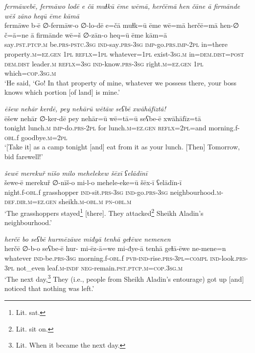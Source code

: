 \ea \label{PM.20}
\textit{fermāwebē, fermāwo lodē e čā muɫkū ēme wēmā, herčēmā hen čāne ā firmānde wēš zāno heqū ēme kāmā} \\ 
\gll fermāwe b-ē ∅-fermāw-o ∅-lo-dē e=čā muɫk=ū ēme wē=mā herčē=mā hen-∅ č=ā=ne ā firmānde wē=š ∅-zān-o heq=ū ēme kām=ā \\ 
 say\textsc{.pst}\textsc{.ptcp}\textsc{.m} be\textsc{.prs}\textsc{-pstc}\textsc{.3sg} \textsc{ind-}say\textsc{.prs}\textsc{-3sg} \textsc{imp-}go\textsc{.prs}.\textsc{imp-}\textsc{2pl} in=there property\textsc{.m}\textsc{\textsc{=ez.gen}} \textsc{1pl} \textsc{reflx}\textsc{=1pl} whatever\textsc{=1pl} exist\textsc{-3sg}\textsc{.m} in=\textsc{dem.dist}\textsc{=\textsc{post}} \textsc{dem.dist} leader\textsc{.m} \textsc{reflx}\textsc{=3sg} \textsc{ind-}know\textsc{.prs}\textsc{-3sg} right\textsc{.m}\textsc{\textsc{=ez.gen}} \textsc{1pl} which\textsc{=cop}\textsc{.3sg}\textsc{.m} \\ 
\glt `He said, ‘Go! In that property of mine, whatever we possess there, your boss knows which portion [of land] is mine.'
\z 
 
\ea \label{PM.21}
\textit{ēšew nehār kerdē, pey nehārū wētāw seʕbē xwāhāfīztā!} \\ 
\gll ēšew nehār ∅-ker-dē pey nehār=ū wē=tā=ū seʕbe-ē xwāhāfīz=tā \\ 
 tonight lunch\textsc{.m} \textsc{imp-}do\textsc{.prs}-\textsc{2pl} for lunch\textsc{.m}\textsc{\textsc{=ez.gen}} \textsc{reflx}=\textsc{2pl}=and morning.f\textsc{-obl}.f goodbye\textsc{.m}=\textsc{2pl} \\ 
\glt `[Take it] as a camp tonight [and] eat from it as your lunch. [Then] Tomorrow, bid farewell!'
\z 
 
\ea \label{PM.23}
\textit{šewē merekuř nīšo milo mehelekew šēxī ʕelādīnī} \\ 
\gll šewe-ē merekuř ∅-nīš-o mi-l-o mehele-eke=ū šēx-ī ʕelādīn-ī \\ 
 night.f\textsc{-obl}.f grasshopper \textsc{ind-}sit\textsc{.prs}\textsc{-3sg} \textsc{ind-}go\textsc{.prs}\textsc{-3sg} neighbourhood\textsc{.m}\textsc{-def}\textsc{.dir}\textsc{.m}\textsc{\textsc{=ez.gen}} sheikh\textsc{.m}\textsc{-obl}\textsc{.m} \textsc{pn}\textsc{-obl}\textsc{.m} \\ 
\glt `The grasshoppers stayed\footnote{Lit. sat.} [there]. They attacked\footnote{Lit. sit on.} Sheikh Aladin’s neighbourhood.'
\z 
 
\ea \label{PM.24}
\textit{herčē bo seʕbē hurmēzāwe miđyā tenhā geɫēwe nemenen} \\ 
\gll herčē ∅-b-o seʕbe-ē hur- mi-ēz-ā=we mi-đye-ā tenhā geɫā-ēwe ne-mene=n \\ 
 whatever \textsc{ind-}be\textsc{.prs}\textsc{-3sg} morning.f\textsc{-obl}.f \textsc{pvb-}\textsc{ind-}rise\textsc{.prs}\textsc{-3pl}\textsc{=compl} \textsc{ind-}look\textsc{.prs}\textsc{-3pl} not\_even leaf\textsc{.m}\textsc{-indf} \textsc{neg-}remain\textsc{.pst}\textsc{.ptcp}\textsc{.m}\textsc{=cop}\textsc{.3sg}\textsc{.m} \\ 
\glt `The next day,\footnote{Lit. When it became the next day.} They (i.e., people from Sheikh Aladin’s entourage) got up [and] noticed that nothing was left.'
\z 
 
